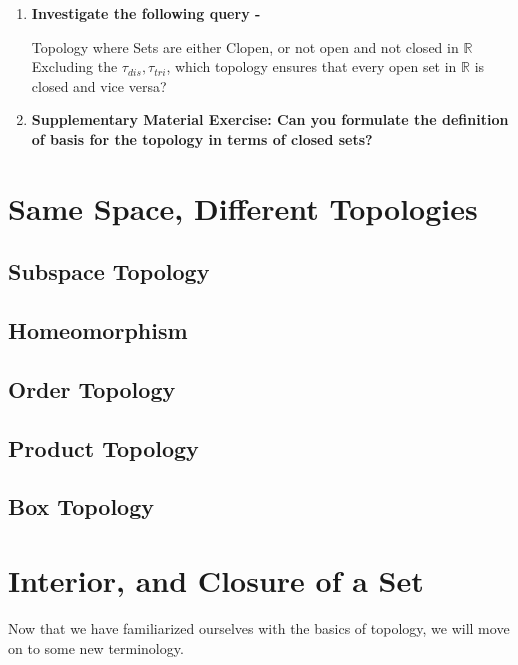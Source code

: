 \begin{enumerate}[label=\textbf{\arabic*.}]
\begin{Query}{Union of Topologies}
        {[Hint: (I) Think of some of the topologies from the set $X=\{a,b,c\}$. (II) You have two bags but can only carry one. But you want to keep both bags, so what would you do in that case? You simply put the smaller bag into the larger one!]}
    \end{Query}
    \newpage
    \item \textbf{Investigate the following query -}
    \begin{Query}{Topology where Sets are either Clopen, or not open and not closed in $\mathbb{R}$}\label{partition_topology_real}
        Excluding the $\tau_{dis}, \tau_{tri}$, which topology ensures that every open set in $\mathbb{R}$ is closed and vice versa?
    \end{Query}
    \item \textbf{Supplementary Material Exercise: Can you formulate the definition of basis for the topology in terms of closed sets?}
\end{enumerate}
\section{Same Space, Different Topologies}
\subsection{Subspace Topology}
\subsection{Homeomorphism}
\subsection{Order Topology}
\subsection{Product Topology}
\subsection{Box Topology}
\section{Interior, and Closure of a Set}
Now that we have familiarized ourselves with the basics of topology, we will move on to some new terminology.
